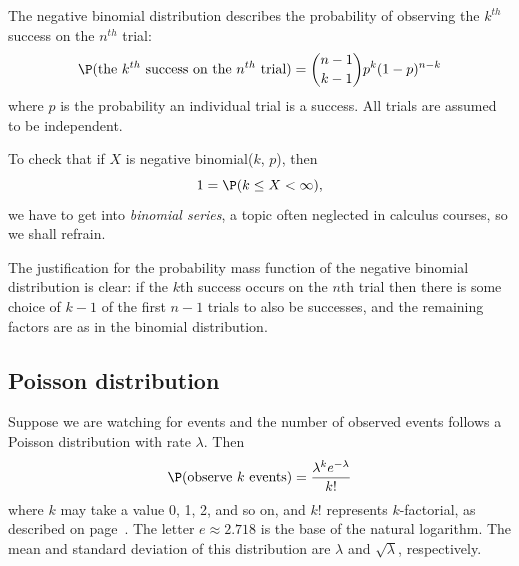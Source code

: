 \begin{termBox}{
The negative binomial distribution describes the probability of observing the $k^{th}$ success on the $n^{th}$ trial:
\begin{eqnarray}
\P(\text{the $k^{th}$ success on the $n^{th}$ trial}) = {n-1 \choose k-1} p^{k}(1-p)^{n-k}
\label{negativeBinomialEquation}
\end{eqnarray}
where $p$ is the probability an individual trial is a success. All trials are assumed to be independent.}
\end{termBox}


To check that if $X$ is negative binomial($k$, $p$), then
\[
	1 = \P(k\le X<\infty),
\]
we have to get into \emph{binomial series}, a topic often neglected in calculus courses, so we shall refrain.

The justification for the probability mass function of the negative binomial distribution is clear: if the $k$th success occurs on the $n$th trial then there is some choice of $k-1$ of the first $n-1$ trials to also be successes, and the remaining factors are as in the binomial distribution.


\subsection{Poisson distribution}
\label{poisson}




\begin{termBox}{
Suppose we are watching for events and the number of observed events follows a Poisson distribution with rate $\lambda$. Then
\begin{align*}
\P(\text{observe $k$ events}) = \frac{\lambda^{k} e^{-\lambda}}{k!}
\end{align*}
where $k$ may take a value 0, 1, 2, and so on, and $k!$ represents $k$-factorial, as described on page~\pageref{factorialDefinitionInTheBinomialSection}. The letter $e\approx2.718$ is the base of the natural logarithm. The mean and standard deviation of this distribution are $\lambda$ and $\sqrt{\lambda}$, respectively.}
\end{termBox}


